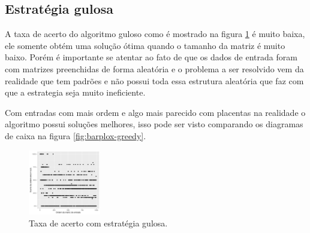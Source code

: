 \documentclass[10.9pt]{article}
\begin{document}
\subsection{Estratégia gulosa}
\label{sec:orgc0f73a7}
A taxa de acerto do algoritmo guloso como é mostrado na figura \ref{fig:greedy-ac} é muito baixa, ele somente obtém uma solução ótima quando o tamanho da matriz é muito baixo. Porém é importante se atentar ao fato de que os dados de entrada foram com matrizes preenchidas de forma aleatória e o problema a ser resolvido vem da realidade que tem padrões e não possui toda essa estrutura aleatória que faz com que a estrategia seja muito ineficiente.

Com entradas com mais ordem e algo mais parecido com placentas na realidade o algoritmo possui soluções melhores, isso pode ser visto comparando os diagramas de caixa na figura \ref{fig:barplox-greedy}.

\begin{figure}[htbp]
\centering
\includegraphics[width=0.28\textwidth]{greedy-ac.jpg}
\caption{Taxa de acerto com estratégia gulosa.\label{fig:greedy-ac}}
\end{figure}
\end{document}
